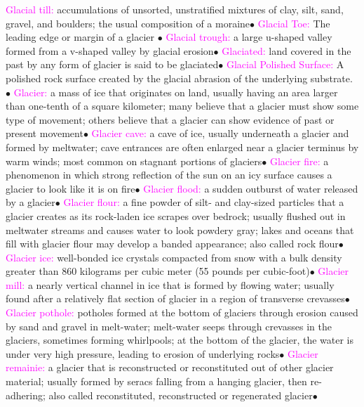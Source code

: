 \documentclass{article}
\newcommand{\ddd}{$\bullet$}
\newcommand{\pink}[1]{\textcolor{magenta}{#1}}
\newcommand{\vocab}[1]{{\pink{#1}}}
\begin{document}
\begin{multicols*}{4}
		\vocab{        Glacial till: } accumulations of unsorted, unstratified mixtures of clay, silt, sand, gravel, and boulders; the usual composition of a moraine\ddd
		\vocab{Glacial Toe: } The leading edge or margin of a glacier \ddd
		\vocab{        Glacial trough: } a large u-shaped valley formed from a v-shaped valley by glacial erosion\ddd
		\vocab{        Glaciated: } land covered in the past by any form of glacier is said to be glaciated\ddd
		\vocab{Glacial Polished Surface: } A polished rock surface created by the glacial abrasion of the underlying substrate. \ddd
		\vocab{        Glacier: } a mass of ice that originates on land, usually having an area larger than one-tenth of a square kilometer; many believe that a glacier must show some type of movement; others believe that a glacier can show evidence of past or present movement\ddd
		\vocab{        Glacier cave: } a cave of ice, usually underneath a glacier and formed by meltwater; cave entrances are often enlarged near a glacier terminus by warm winds; most common on stagnant portions of glaciers\ddd
		\vocab{        Glacier fire: } a phenomenon in which strong reflection of the sun on an icy surface causes a glacier to look like it is on fire\ddd
		\vocab{        Glacier flood: } a sudden outburst of water released by a glacier\ddd
		\vocab{        Glacier flour: } a fine powder of silt- and clay-sized particles that a glacier creates as its rock-laden ice scrapes over bedrock; usually flushed out in meltwater streams and causes water to look powdery gray; lakes and oceans that fill with glacier flour may develop a banded appearance; also called rock flour\ddd
		\vocab{        Glacier ice: } well-bonded ice crystals compacted from snow with a bulk density greater than 860 kilograms per cubic meter (55 pounds per cubic-foot)\ddd
		\vocab{        Glacier mill: } a nearly vertical channel in ice that is formed by flowing water; usually found after a relatively flat section of glacier in a region of transverse crevasses\ddd
		\vocab{        Glacier pothole: } potholes formed at the bottom of glaciers through erosion caused by sand and gravel in melt-water; melt-water seeps through crevasses in the glaciers, sometimes forming whirlpools; at the bottom of the glacier, the water is under very high pressure, leading to erosion of underlying rocks\ddd
		\vocab{        Glacier remainie: } a glacier that is reconstructed or reconstituted out of other glacier material; usually formed by seracs falling from a hanging glacier, then re-adhering; also called reconstituted, reconstructed or regenerated glacier\ddd

\end{multicols*}
\end{document}

